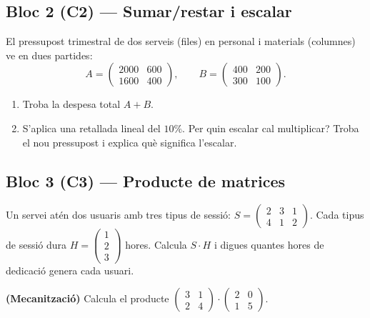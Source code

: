 \subsection{Bloc 2 (C2) — Sumar/restar i escalar}

\begin{exercicis}
\begin{exlist}
  \item El pressupost trimestral de dos serveis (files) en personal i materials
        (columnes) ve en dues partides:
        \[ A=\begin{pmatrix} 2000 & 600 \\ 1600 & 400 \end{pmatrix},\qquad
           B=\begin{pmatrix} 400 & 200 \\ 300 & 100 \end{pmatrix}. \]
        \begin{enumerate}[label=\alph*), leftmargin=1.6em, topsep=2pt]
          \item Troba la despesa total $A+B$.
          \item S'aplica una retallada lineal del $10\%$. Per quin escalar cal
                multiplicar? Troba el nou pressupost i explica què significa l'escalar.
        \end{enumerate}
\end{exlist}
\end{exercicis}

\subsection{Bloc 3 (C3) — Producte de matrices}

\begin{exercicis}
\begin{exlist}
  \item Un servei atén dos usuaris amb tres tipus de sessió:
        $S=\begin{pmatrix} 2 & 3 & 1 \\ 4 & 1 & 2 \end{pmatrix}$. Cada tipus de sessió
        dura $H=\begin{pmatrix} 1 \\ 2 \\ 3 \end{pmatrix}$ hores. Calcula $S\cdot H$ i
        digues quantes hores de dedicació genera cada usuari.
  \item \textbf{(Mecanització)} Calcula el producte
        $\begin{pmatrix} 3 & 1 \\ 2 & 4 \end{pmatrix}\cdot\begin{pmatrix} 2 & 0 \\ 1 & 5 \end{pmatrix}$.
\end{exlist}
\end{exercicis}

